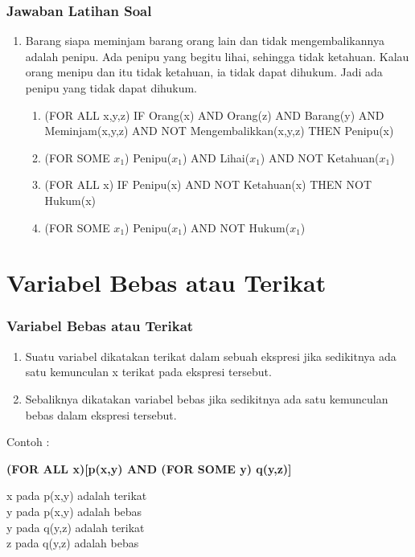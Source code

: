 \documentclass[handout]{beamer}
\theoremstyle{definition}
\theoremstyle{example}
\begin{document}
\begin{frame}
	\frametitle{Jawaban Latihan Soal}
	\begin{enumerate}
		\addtocounter{enumi}{6}
		\item {\color{red}Barang siapa} meminjam barang orang lain dan tidak mengembalikannya adalah penipu. {\color{red}Ada} penipu yang begitu lihai, sehingga tidak ketahuan.
		Kalau {\color{red}orang} menipu dan itu tidak ketahuan, ia tidak dapat dihukum.
		Jadi {\color{red}ada} penipu yang tidak dapat dihukum.\\
		\begin{enumerate}
		\item (FOR ALL x,y,z) IF Orang(x) AND Orang(z) AND Barang(y) AND Meminjam(x,y,z) 
		AND NOT Mengembalikkan(x,y,z) THEN Penipu(x)
		\item (FOR SOME $x_1$) Penipu($x_1$) AND Lihai($x_1$) AND NOT Ketahuan($x_1$)
		\item (FOR ALL x) IF Penipu(x) AND NOT Ketahuan(x) THEN NOT Hukum(x)
		\item (FOR SOME $x_1$) Penipu($x_1$) AND NOT Hukum($x_1$)
	    \end{enumerate} 			
\end{enumerate}
\end{frame}

\section{Variabel Bebas atau Terikat}
\begin{frame}
	\frametitle{Variabel Bebas atau Terikat}
    \begin{enumerate}
    	\item Suatu variabel dikatakan terikat dalam sebuah ekspresi jika sedikitnya ada satu kemunculan x terikat pada ekspresi tersebut.
    	\item Sebaliknya dikatakan variabel bebas jika sedikitnya ada satu kemunculan bebas dalam ekspresi tersebut.
    \end{enumerate}
     Contoh : \\ 
     \begin{center}
     	\textbf{(FOR ALL x)[p(x,y) AND (FOR SOME y) q(y,z)]}
     \end{center}
      x pada p(x,y) adalah terikat\\
      y pada p(x,y) adalah bebas\\
      y pada q(y,z) adalah terikat\\
      z pada q(y,z) adalah bebas 
     
\end{frame}	
\end{document}
